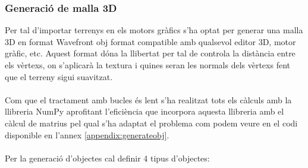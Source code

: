 \documentclass[10pt,a4paper]{article}
\begin{document}
\subsubsection{Generació de malla 3D}
\label{mesh3d}
Per tal d'importar terrenys en els motors gràfics s'ha optat per generar una malla 3D en format Wavefront obj\cite{wavefrontobj} format compatible amb qualsevol editor 3D, motor gràfic, etc. Aquest format dóna la llibertat per tal de controla la distància entre els vèrtexs, on s'aplicarà la textura i quines seran les normals dels vèrtexs fent que el terreny sigui suavitzat.
\\
\\
Com que el tractament amb bucles és lent s'ha realitzat tots els càlculs amb la llibreria NumPy aprofitant l'eficiència que incorpora aquesta llibreria amb el càlcul de matrius pel qual s'ha adaptat el problema com podem veure en el codi disponible en l'annex \ref{appendix:generateobj}.
\\
\\
Per la generació d'objectes cal definir 4 tipus d'objectes:
\end{document}
